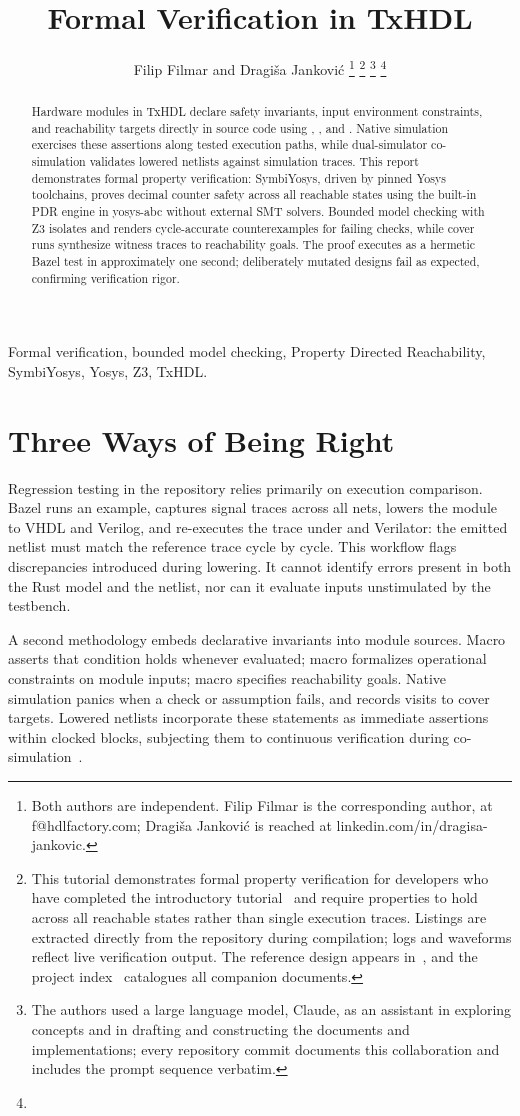 \documentclass[journal,9pt]{IEEEtran}
\title{Formal Verification in TxHDL}
\author{Filip Filmar and Dragiša Janković%
\thanks{Both authors are independent. Filip Filmar is the
corresponding author, at f@hdlfactory.com; Dragiša Janković is
reached at linkedin.com/in/dragisa-jankovic.}%
\thanks{This tutorial demonstrates formal property verification for developers
who have completed the introductory tutorial~\cite{tutorial} and require
properties to hold across all reachable states rather than single execution
traces. Listings are extracted directly from the repository \code{HDL/txhdl}
during compilation; logs and waveforms reflect live verification output. The
reference design appears in~\cite{examples}, and the project index~\cite{cover}
catalogues all companion documents.}%
\thanks{The authors used a large language model, Claude, as an
assistant in exploring concepts and in drafting and constructing
the documents and implementations; every repository commit documents
this collaboration and includes the prompt sequence verbatim.}%
\thanks{\buildstamp}}
\begin{document}
\maketitle

\begin{abstract}
Hardware modules in TxHDL declare safety invariants, input environment
constraints, and reachability targets directly in source code using
, , and . Native simulation exercises
these assertions along tested execution paths, while dual-simulator
co-simulation validates lowered netlists against simulation traces. This report
demonstrates formal property verification: SymbiYosys, driven by pinned Yosys
toolchains, proves decimal counter safety across all reachable states using the
built-in PDR engine in yosys-abc without external SMT solvers. Bounded model
checking with Z3 isolates and renders cycle-accurate counterexamples for
failing checks, while cover runs synthesize witness traces to reachability
goals. The proof executes as a hermetic Bazel test in approximately one second;
deliberately mutated designs fail as expected, confirming verification rigor.
\end{abstract}

\begin{IEEEkeywords}
Formal verification, bounded model checking, Property Directed Reachability,
SymbiYosys, Yosys, Z3, TxHDL.
\end{IEEEkeywords}

\section{Three Ways of Being Right}
\label{sec:p-three}

Regression testing in the repository relies primarily on execution comparison.
Bazel runs an example, captures signal traces across all nets, lowers the module
to VHDL and Verilog, and re-executes the trace under  and Verilator:
the emitted netlist must match the reference trace cycle by cycle. This workflow
flags discrepancies introduced during lowering. It cannot identify errors
present in both the Rust model and the netlist, nor can it evaluate inputs
unstimulated by the testbench.

A second methodology embeds declarative invariants into module sources. Macro
 asserts that condition  holds whenever
evaluated; macro  formalizes operational constraints on
module inputs; macro  specifies reachability goals.
Native simulation panics when a check or assumption fails, and records visits
to cover targets. Lowered netlists incorporate these statements as immediate
assertions within clocked blocks, subjecting them to continuous verification
during co-simulation~\cite{tutorial, examples}.
\end{document}
